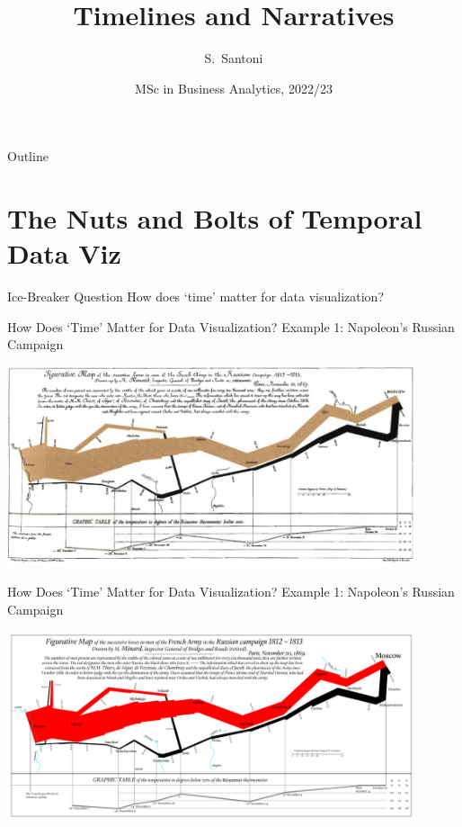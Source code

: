 \documentclass[notes, aspectratio=1610]{beamer}
\title{Timelines and Narratives}
\author{S.~Santoni\inst{1}\inst{2}}
\institute{
	\inst{1}%
	Bayes Business School
	\and
	\inst{2}%
	Soundcloud
	}
\date{MSc in Business Analytics, 2022/23}
\begin{document}
\begin{frame}
	\titlepage
\end{frame}

\begin{frame}{Outline}
	\tableofcontents
\end{frame}

\section{The Nuts and Bolts of Temporal Data Viz}

\begin{frame}{Ice-Breaker Question}{}
	\centering 
	\Large 
	How does `time' matter for data visualization?
\end{frame}

\begin{frame}{How Does `Time' Matter for Data Visualization?}
	{Example 1: Napoleon's Russian Campaign}
	\centering 
	\Large

	\includegraphics[width=0.9\textwidth]{images/russian_campaign.png}

\end{frame}

\begin{frame}{How Does `Time' Matter for Data Visualization?}
	{Example 1: Napoleon's Russian Campaign}
	\centering 
	\Large

	\includegraphics[width=0.9\textwidth]{images/1920px-Minard_Update.png}

\end{frame}
\end{document}
